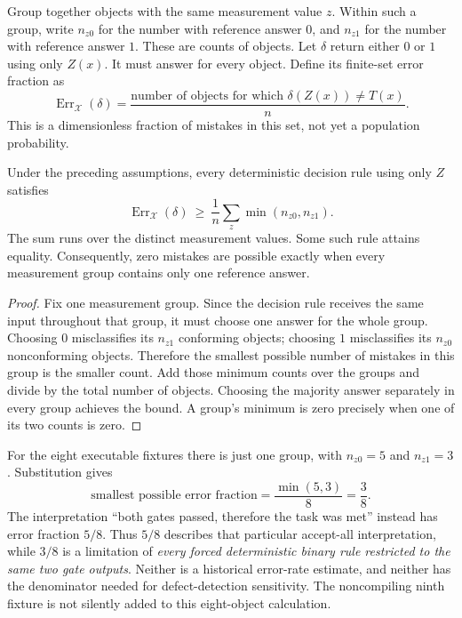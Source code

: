 Group together objects with the same measurement value $z$. Within such a
group, write $n_{z0}$ for the number with reference answer $0$, and $n_{z1}$
for the number with reference answer $1$. These are counts of objects. Let
$\delta$ return either $0$ or $1$ using only $Z(x)$. It must answer
for every object. Define its finite-set error fraction as
\[
\operatorname{Err}_{\mathcal X}(\delta)
=\frac{\text{number of objects for which }\delta(Z(x))\ne T(x)}{n}.
\]
This is a dimensionless fraction of mistakes in this set, not yet a
population probability.

\begin{proposition}
\label{prop:measurement}
Under the preceding assumptions, every deterministic decision rule using
only $Z$ satisfies
\[
\operatorname{Err}_{\mathcal X}(\delta)
\ \ge\ \frac{1}{n}\sum_z\min(n_{z0},n_{z1}).
\]
The sum runs over the distinct measurement values. Some such rule attains equality.
Consequently, zero mistakes are possible exactly when every measurement group
contains only one reference answer.
\end{proposition}

\begin{proof}
Fix one measurement group. Since the decision rule receives the same input
throughout that group, it must choose one answer for the whole group. Choosing
$0$ misclassifies its $n_{z1}$ conforming objects; choosing $1$ misclassifies
its $n_{z0}$ nonconforming objects. Therefore the smallest possible number of
mistakes in this group is the smaller count. Add those minimum counts over
the groups and divide by the total number of objects. Choosing the majority
answer separately in every group achieves the bound. A group's minimum is
zero precisely when one of its two counts is zero.
\end{proof}

For the eight executable fixtures there is just one group, with $n_{z0}=5$
and $n_{z1}=3$. Substitution gives
\[
\text{smallest possible error fraction}=\frac{\min(5,3)}8=\frac38.
\]
The interpretation ``both gates passed, therefore the task was met''
instead has error fraction $5/8$. Thus $5/8$ describes that particular
accept-all interpretation, while $3/8$ is a limitation of \emph{every forced
deterministic binary rule restricted to the same two gate outputs}. Neither
is a historical error-rate estimate, and neither has the denominator needed
for defect-detection sensitivity. The noncompiling ninth fixture is not
silently added to this eight-object calculation.

